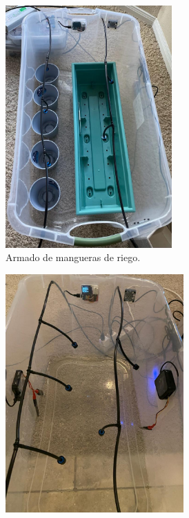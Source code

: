 \begin{figure}[!htpb]
     \centering
     \begin{subfigure}[b]{0.45\textwidth}
		\centering
		\includegraphics[width=0.70\textwidth]{./Figures/chapter4/Invernadero1.jpg}
		\caption{Armado de mangueras de riego.}
		\label{fig:gh1}
     \end{subfigure}
     \hfill
     \begin{subfigure}[b]{0.45\textwidth}
	    \centering
		 \includegraphics[width=0.75\textwidth]{./Figures/chapter4/Invernadero2.jpg}

\end{subfigure}
\end{figure}
